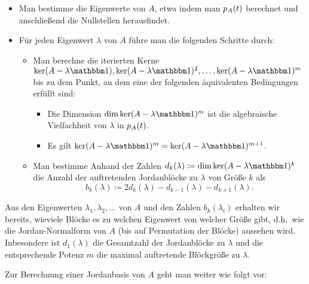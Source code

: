 \begin{itemize}
  \item
    Man bestimme die Eigenwerte von $A$, etwa indem man $p_{A}(t)$ berechnet und anschließend die Nullstellen herausfindet.
    
  \item
    Für jeden Eigenwert $\lambda$ von $A$ führe man die folgenden Schritte durch:
    \begin{itemize}
      \item
        Man berechne die iterierten Kerne $\ker (A - \lambda \Id), \ker (A - \lambda \Id)^2, \dotsc, \ker (A - \lambda \Id)^m$ bis zu dem Punkt, an dem eine der folgenden äquivalenten Bedingungen erfüllt sind:
        \begin{itemize}
          \item
            Die Dimension $\dim \ker (A - \lambda \Id)^m$ ist die algebraische Vielfachheit von $\lambda$ in $p_{A}(t)$.
          \item
            Es gilt $\ker (A - \lambda \Id)^m = \ker (A - \lambda \Id)^{m+1}$.
        \end{itemize}
      \item
        Man bestimme Anhand der Zahlen $d_k(\lambda) \coloneqq \dim \ker (A - \lambda \Id)^k$ die Anzahl der auftretenden Jordanblöcke zu $\lambda$ von Größe $k$ als
        \[
          b_k(\lambda) \coloneqq 2 d_k(\lambda) - d_{k-1}(\lambda) - d_{k+1}(\lambda).
        \]
    \end{itemize}
\end{itemize}

Aus den Eigenwerten $\lambda_1, \lambda_2, \dotsc$ von $A$ und den Zahlen $b_k(\lambda_i)$ erhalten wir bereits, wieviele Blöcke es zu welchen Eigenwert von welcher Größe gibt, d.h.\ wie die Jordan-Normalform von $A$ (bis auf Permutation der Blöcke) aussehen wird.
Inbesondere ist $d_1(\lambda)$ die Gesamtzahl der Jordanblöcke zu $\lambda$ und die entsprechende Potenz $m$ die maximal auftretende Blöckgröße zu $\lambda$.

Zur Berechnung einer Jordanbasis von $A$ geht man weiter wie folgt vor:

